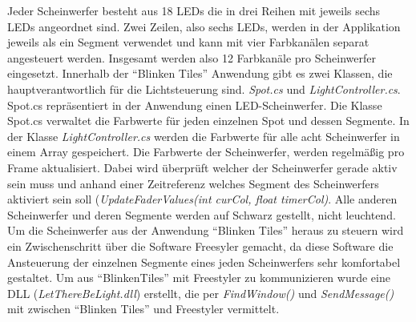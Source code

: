Jeder Scheinwerfer besteht aus 18 LEDs die in drei Reihen mit jeweils sechs LEDs angeordnet sind. Zwei Zeilen, also sechs LEDs, werden in der Applikation jeweils als ein Segment verwendet und  kann mit vier Farbkanälen separat angesteuert werden. Insgesamt werden also 12 Farbkanäle pro Scheinwerfer eingesetzt. Innerhalb der "`Blinken Tiles"' Anwendung gibt es zwei Klassen, die hauptverantwortlich für die Lichtsteuerung sind. \emph{Spot.cs} und \emph{LightController.cs}. Spot.cs repräsentiert in der Anwendung einen LED-Scheinwerfer. Die Klasse Spot.cs verwaltet die Farbwerte für jeden einzelnen Spot und dessen Segmente. In der Klasse \emph{LightController.cs} werden die Farbwerte für alle acht Scheinwerfer in einem Array gespeichert. Die Farbwerte der Scheinwerfer, werden regelmäßig pro Frame aktualisiert. Dabei wird überprüft welcher der Scheinwerfer gerade aktiv sein muss und anhand einer Zeitreferenz welches Segment des Scheinwerfers aktiviert sein soll (\emph{UpdateFaderValues(int curCol, float timerCol)}. Alle anderen Scheinwerfer und deren Segmente werden auf Schwarz gestellt, nicht leuchtend. 
Um die Scheinwerfer aus der Anwendung "`Blinken Tiles"' heraus zu steuern wird ein Zwischenschritt über die Software Freesyler gemacht, da diese Software die Ansteuerung der einzelnen Segmente eines jeden Scheinwerfers sehr komfortabel gestaltet. Um aus "`BlinkenTiles"' mit Freestyler zu kommunizieren wurde eine DLL (\emph{LetThereBeLight.dll}) erstellt, die per \emph{FindWindow()} und \emph{SendMessage()} mit zwischen "`Blinken Tiles"' und Freestyler vermittelt.


